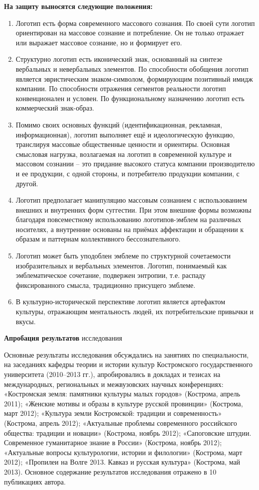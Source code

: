 \textbf{На защиту выносятся следующие положения:}
\begin{enumerate}
\item Логотип есть форма современного массового сознания. По своей сути логотип ориентирован на массовое сознание и потребление. Он не только отражает или выражает массовое сознание, но и формирует его.
\item Структурно логотип есть иконический знак, основанный на синтезе вербальных и невербальных элементов. По способности обобщения логотип является эвристическим знаком-символом, формирующим позитивный имидж компании. По способности отражения сегментов реальности логотип конвенционален и условен. По функциональному назначению логотип есть коммерческий знак-образ.
\item Помимо своих основных функций (идентификационная, рекламная, информационная), логотип выполняет ещё и идеологическую функцию, транслируя массовые общественные ценности и ориентиры. Основная смысловая нагрузка, возлагаемая на логотип в современной культуре и массовом сознании – это придание высокого статуса компании производителю и ее продукции, с одной стороны, и потребителю продукции компании, с другой.
\item Логотип предполагает манипуляцию массовым сознанием с использованием внешних и внутренних форм суггестии. При этом внешние формы возможны благодаря повсеместному использованию логотипов-эмблем на различных носителях, а внутренние основаны на приёмах аффектации и обращении к образам и паттернам коллективного бессознательного.
\item Логотип может быть уподоблен эмблеме по структурной сочетаемости изобразительных и вербальных элементов. Логотип, понимаемый как эмблематическое сочетание, подвержен энтропии, т.е. распаду фиксированного смысла, традиционно присущего эмблеме.
\item В культурно-исторической перспективе логотип является артефактом культуры, отражающим ментальность людей, их потребительские привычки и вкусы.
\end{enumerate}

\textbf{Апробация результатов} исследования

Основные результаты исследования обсуждались на занятиях по специальности, на заседаниях кафедры теории и истории культур Костромского государственного университета (2010–2013 гг.), апробировались в докладах и тезисах на международных, региональных и межвузовских научных конференциях: «Костромская земля: памятники культуры малых городов» (Кострома, апрель 2011); «Женские мотивы и образы в культуре русской провинции» (Кострома, март 2012); «Культура земли Костромской: традиции и современность» (Кострома, апрель 2012); «Актуальные проблемы современного российского общества: традиции и новации» (Кострома, ноябрь 2012); «Сапоговские штудии. Современное гуманитарное знание в России» (Кострома, ноябрь 2012); «Актуальные вопросы культурологии, истории и филологии» (Кострома, март 2012); «Пропилеи на Волге 2013. Кавказ и русская культура» (Кострома, май 2013). Основное содержание результатов исследования отражено в 10 публикациях автора.

